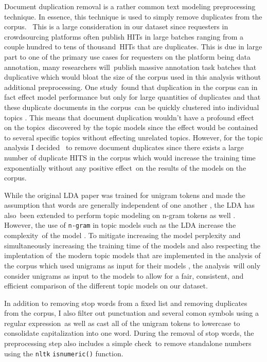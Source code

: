 \documentclass[letterpaper,12pt]{article}
\begin{document}
Document duplication removal is a rather common text modeling preprocessing technique. In essence, this technique is used to simply remove duplicates from the corpus. \
This is a large consideration in our dataset since requesters in crowdsourcing platforms often publish HITs in large batches ranging from a couple hundred to tens of thousand\
HITs that are duplicates. This is due in large part to one of the primary use cases for requesters on the platform being data annotation, many researchers will\
publish massive annotation task batches that duplicative which would bloat the size of the corpus used in this analysis without additional preprocessing. One study\
found that duplication in the corpus can in fact effect model performance but only for large quantities of duplicates and that these duplicate documents in the corpus\
can be quickly clustered into individual topics \cite{schofieldunderstanding}. This means that document duplication wouldn't have a profound effect on the topics\
discovered by the topic models since the effect would be contained to several specific topics without effecting unrelated topics. However, for the topic analysis I decided \
to remove document duplicates since there exists a large number of duplicate HITS in the corpus which would increase the training time exponentially without any positive effect\
on the results of the models on the corpus.

While the original LDA paper was trained for unigram tokens and made the assumption that words are generally independent of one another \cite{blei2003latent}, the LDA has also\
been extended to perform topic modeling on n-gram tokens as well \cite{wang2005note}. However, the use of \texttt{n-gram} in topic models such as the LDA increase the complexity\
of the model \cite{wang2007topical}. To mitigate increasing the model perplexity and simultaneously increasing the training time of the models and also respecting the implentation of\
the modern topic models that are implemented in the analysis of the corpus which used unigrams as input for their models \cite{moody2016mixing}\cite{dieng2019topic}, the analysis\
will only consider unigrams as input to the models to allow for a fair, consistent, and efficient comparison of the different topic models on our dataset.

In addition to removing stop words from a fixed list and removing duplicates from the corpus, I also filter out punctuation and several comon symbols using a regular expression\
as well as cast all of the unigram tokens to lowercase to consolidate capitalization into one word. During the removal of stop words, the preprocessing step also includes a simple check\
to remove standalone numbers using the \texttt{nltk} \cite{loper2002nltk} \texttt{isnumeric()} function.
\end{document}
